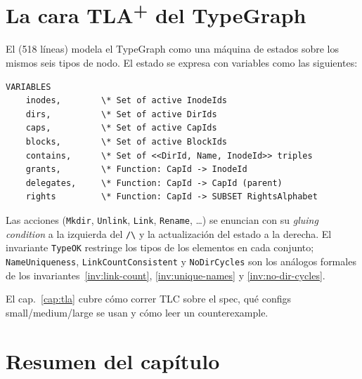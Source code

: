 \section{La cara TLA\textsuperscript{+} del TypeGraph}

El  (518 líneas) modela el TypeGraph como una
máquina de estados sobre los mismos seis tipos de nodo. El estado se
expresa con variables como las siguientes:

\begin{lstlisting}[language=tla, caption={Extracto del estado en
\texttt{sotfs\_graph.tla}.}, label={lst:tla-state}]
VARIABLES
    inodes,        \* Set of active InodeIds
    dirs,          \* Set of active DirIds
    caps,          \* Set of active CapIds
    blocks,        \* Set of active BlockIds
    contains,      \* Set of <<DirId, Name, InodeId>> triples
    grants,        \* Function: CapId -> InodeId
    delegates,     \* Function: CapId -> CapId (parent)
    rights         \* Function: CapId -> SUBSET RightsAlphabet
\end{lstlisting}

Las acciones (\texttt{Mkdir}, \texttt{Unlink}, \texttt{Link},
\texttt{Rename}, \dots) se enuncian con su \emph{gluing condition} a la
izquierda del \texttt{/\textbackslash} y la actualización del estado a la
derecha. El invariante \texttt{TypeOK} restringe los tipos de los
elementos en cada conjunto; \texttt{NameUniqueness},
\texttt{LinkCountConsistent} y \texttt{NoDirCycles} son los análogos
formales de los invariantes~\ref{inv:link-count},
\ref{inv:unique-names} y \ref{inv:no-dir-cycles}.

El cap.~\ref{cap:tla} cubre cómo correr TLC sobre el spec, qué configs
small/medium/large se usan y cómo leer un counterexample.

\section{Resumen del capítulo}

